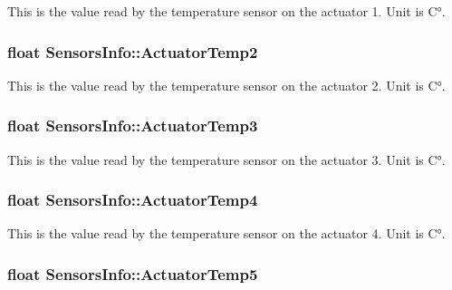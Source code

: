 This is the value read by the temperature sensor on the actuator 1. Unit is C°. 

\subsubsection[{\texorpdfstring{Actuator\+Temp2}{ActuatorTemp2}}]{\setlength{\rightskip}{0pt plus 5cm}float Sensors\+Info\+::\+Actuator\+Temp2}\hypertarget{structSensorsInfo_abf182850e94b2bab72a282eb2a76be75}{}\label{structSensorsInfo_abf182850e94b2bab72a282eb2a76be75}


This is the value read by the temperature sensor on the actuator 2. Unit is C°. 

\subsubsection[{\texorpdfstring{Actuator\+Temp3}{ActuatorTemp3}}]{\setlength{\rightskip}{0pt plus 5cm}float Sensors\+Info\+::\+Actuator\+Temp3}\hypertarget{structSensorsInfo_aae8cdcf3e2412f99ec5cdc5a13db1528}{}\label{structSensorsInfo_aae8cdcf3e2412f99ec5cdc5a13db1528}


This is the value read by the temperature sensor on the actuator 3. Unit is C°. 

\subsubsection[{\texorpdfstring{Actuator\+Temp4}{ActuatorTemp4}}]{\setlength{\rightskip}{0pt plus 5cm}float Sensors\+Info\+::\+Actuator\+Temp4}\hypertarget{structSensorsInfo_a69bb9fe27b7e18a1c09da9135a13c324}{}\label{structSensorsInfo_a69bb9fe27b7e18a1c09da9135a13c324}


This is the value read by the temperature sensor on the actuator 4. Unit is C°. 

\subsubsection[{\texorpdfstring{Actuator\+Temp5}{ActuatorTemp5}}]{\setlength{\rightskip}{0pt plus 5cm}float Sensors\+Info\+::\+Actuator\+Temp5}\hypertarget{structSensorsInfo_a03c089c08df66cc62b0aa768557e2128}{}\label{structSensorsInfo_a03c089c08df66cc62b0aa768557e2128}


